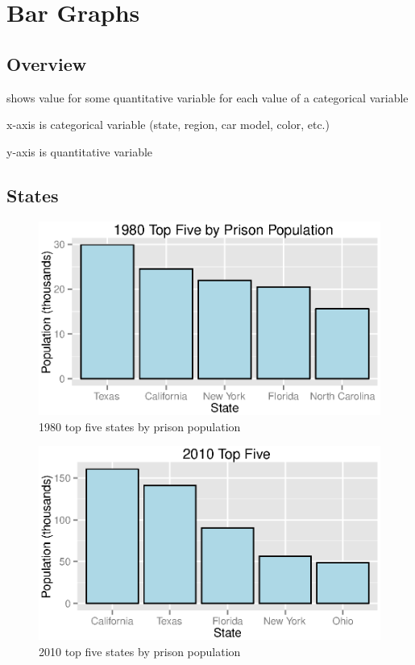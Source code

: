\documentclass{exam}
\begin{document}
  \section{Bar Graphs}

  \subsection{Overview}
  \begin{itemize*}
    \item shows value for some quantitative variable for each value of a categorical variable
    \item x-axis is categorical variable (state, region, car model, color, etc.)
    \item y-axis is quantitative variable
  \end{itemize*}

  \subsection{States}

  \begin{figure}[H]
    \centering
    \includegraphics[scale = 0.9]{figures/top_five_1980.eps}
    \caption{1980 top five states by prison population}
  \end{figure}

  \begin{figure}[H]
    \centering
    \includegraphics[scale = 0.9]{figures/top_five_2010.eps}
    \caption{2010 top five states by prison population}
  \end{figure}
\end{document}
